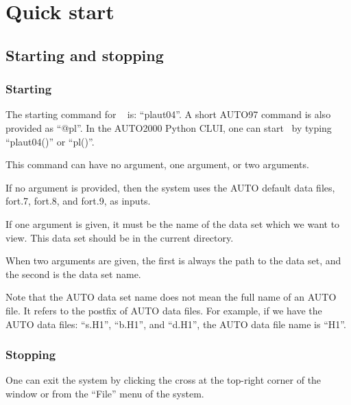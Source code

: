 \section{Quick start}

\subsection{Starting and stopping \PLAUT }

\subsubsection{Starting}

The starting command for \PLAUT~ is: ``plaut04''. A short AUTO97 
command is also provided as ``@pl''. In the AUTO2000 Python CLUI, one can start \PLAUT
~by typing ``plaut04()'' or ``pl()''.
 
This command can have no argument, one argument, or two arguments. 

If no argument is provided, then the system uses the AUTO default data files,  
fort.7, fort.8, and fort.9, as inputs. 

If one argument is given, it must be the name of the data set which we want  
to view. This data set should be in the current directory.

When two arguments are given,
the first is always the path to the data set, and the second is the data set name. 

Note that the AUTO data set name does not mean the full name of an AUTO file. It refers to
the postfix of AUTO data files. For example, if we have the AUTO
data files: ``s.H1'', ``b.H1'', and ``d.H1'', the AUTO data file name is ``H1''.

\subsubsection{Stopping}

One can exit the system by
clicking the cross at the top-right corner of the window or from the ``File'' menu of the system.

